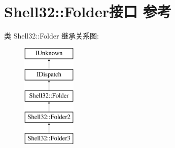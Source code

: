 \hypertarget{interface_shell32_1_1_folder}{}\section{Shell32\+:\+:Folder接口 参考}
\label{interface_shell32_1_1_folder}
类 Shell32\+:\+:Folder 继承关系图\+:\begin{figure}[H]
\begin{center}
\leavevmode
\includegraphics[height=5.000000cm]{interface_shell32_1_1_folder}
\end{center}
\end{figure}
